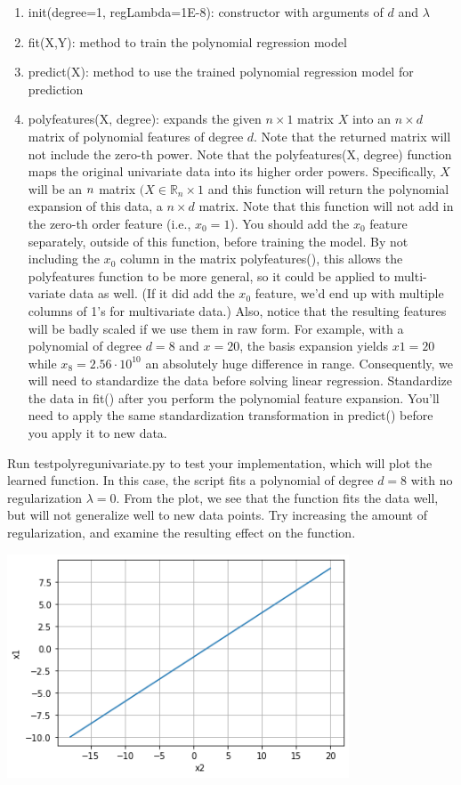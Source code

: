 \documentclass{article}
\newcommand{\field}[1]{\mathbb{#1}}
\newcommand{\1}{\mathbf{1}}
\newcommand{\R}{\field{R}} %
\begin{document}
\begin{enumerate}
    \item init(degree=1, regLambda=1E-8):  constructor with arguments of $d$ and $\lambda$
    \item fit(X,Y): method to train the polynomial regression model
    \item predict(X): method to use the trained polynomial regression model for prediction
    \item polyfeatures(X, degree): expands the given $n\times1$ matrix $X$ into an $n\times d$ matrix of polynomial features of degree $d$. Note that the returned matrix will not include the zero-th power. Note that the polyfeatures(X, degree) function maps the original univariate data into its higher order powers. Specifically, $X$ will be an $n\time1$ matrix $(X\in\R_n\times1$ and this function will return the polynomial expansion of this data,  a $n\times d$ matrix. Note that this function will not add in the zero-th order feature (i.e., $x_0= 1$). You should add the $x_0$ feature separately, outside of this function, before training the model. By not including the $x_0$ column in the matrix polyfeatures(), this allows the polyfeatures function to be more general, so it could be applied to multi-variate data as well. (If it did add the $x_0$ feature, we’d end up with multiple columns of 1’s for multivariate data.) Also, notice that the resulting features will be badly scaled if we use them in raw form. For example, with a polynomial of degree $d=8$ and $x=20$, the basis expansion yields $x1=20$ while $x_8=2.56\cdot10^{10}$ an absolutely huge difference in range. Consequently, we will need to standardize the data before solving linear regression. Standardize the data in fit() after you perform the polynomial feature expansion. You’ll need to apply the same standardization transformation in predict() before you apply it to new data.
\end{enumerate}
Run testpolyregunivariate.py to test your implementation, which will plot the learned function. In this case, the script fits a polynomial of degree $d=8$ with no regularization $\lambda=0$. From the plot, we see that the function fits the data well, but will not generalize well to new data points. Try increasing the amount of regularization, and examine the resulting effect on the function. \\

\begin{center}
    \includegraphics[width=4in]{HW0_plots/hyperplane.png}
\end{center} 
\end{document}
